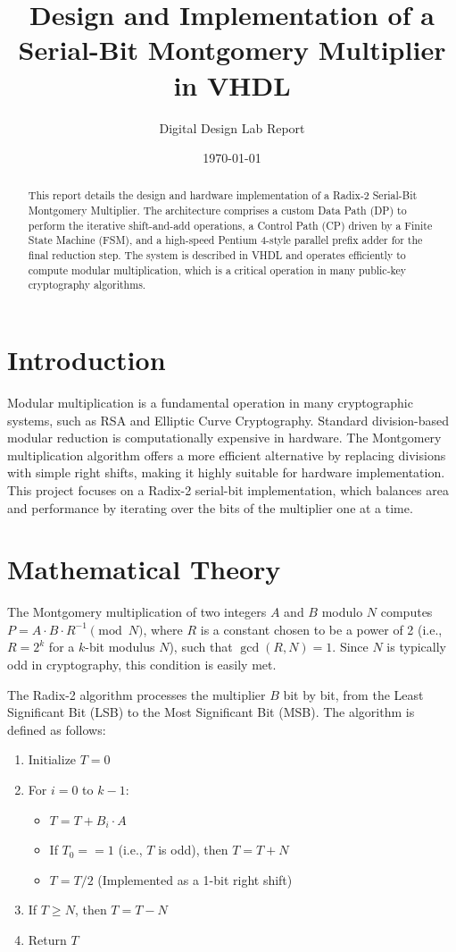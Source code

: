 \documentclass[12pt,a4paper]{article}
\title{\textbf{Design and Implementation of a Serial-Bit Montgomery Multiplier in VHDL}}
\author{Digital Design Lab Report}
\date{\today}
\begin{document}
\maketitle

\begin{abstract}
This report details the design and hardware implementation of a Radix-2 Serial-Bit Montgomery Multiplier. The architecture comprises a custom Data Path (DP) to perform the iterative shift-and-add operations, a Control Path (CP) driven by a Finite State Machine (FSM), and a high-speed Pentium 4-style parallel prefix adder for the final reduction step. The system is described in VHDL and operates efficiently to compute modular multiplication, which is a critical operation in many public-key cryptography algorithms.
\end{abstract}

\section{Introduction}
Modular multiplication is a fundamental operation in many cryptographic systems, such as RSA and Elliptic Curve Cryptography. Standard division-based modular reduction is computationally expensive in hardware. The Montgomery multiplication algorithm offers a more efficient alternative by replacing divisions with simple right shifts, making it highly suitable for hardware implementation. This project focuses on a Radix-2 serial-bit implementation, which balances area and performance by iterating over the bits of the multiplier one at a time.

\section{Mathematical Theory}
The Montgomery multiplication of two integers $A$ and $B$ modulo $N$ computes $P = A \cdot B \cdot R^{-1} \pmod N$, where $R$ is a constant chosen to be a power of 2 (i.e., $R = 2^k$ for a $k$-bit modulus $N$), such that $\gcd(R, N) = 1$. Since $N$ is typically odd in cryptography, this condition is easily met.

The Radix-2 algorithm processes the multiplier $B$ bit by bit, from the Least Significant Bit (LSB) to the Most Significant Bit (MSB). The algorithm is defined as follows:

\begin{enumerate}
    \item Initialize $T = 0$
    \item For $i = 0$ to $k-1$:
    \begin{itemize}
        \item $T = T + B_i \cdot A$
        \item If $T_0 == 1$ (i.e., $T$ is odd), then $T = T + N$
        \item $T = T / 2$ (Implemented as a 1-bit right shift)
    \end{itemize}
    \item If $T \geq N$, then $T = T - N$
    \item Return $T$
\end{enumerate}
\end{document}
